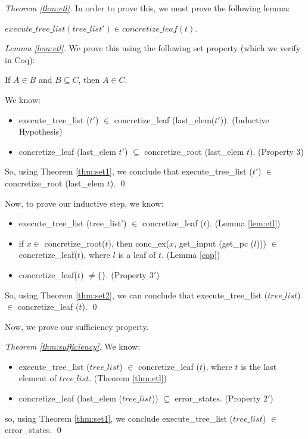 \begin{proof}[Theorem \ref{thm:etl}]
In order to prove this, we must prove the following lemma:
\begin{lemma} 
\label{lem:etl}
$execute\_tree\_list (tree\_list') \in concretize\_leaf (t)$.
\end{lemma}
\begin{proof}[Lemma \ref{lem:etl}]
We prove this using the following set property (which we verify in Coq):

\begin{theorem} \label{thm:set1}
If $A \in B$ and $B \subseteq C$, then $A \in C$.
\end{theorem}

We know:
\begin{itemize}
\item execute\_tree\_list ($t'$) $\in$
        concretize\_leaf (last\_elem($t'$)). (Inductive Hypothesis)
\item 
concretize\_leaf (last\_elem $t'$) $\subseteq$ concretize\_root (last\_elem $t$). (Property $3$)
 \end{itemize}
 
 So, using Theorem \ref{thm:set1}, we conclude that execute\_tree\_list ($t'$) $\in$ concretize\_root (last\_elem $t$). \qed
\end{proof}

Now, to prove our inductive step, we know:
\begin{itemize}
\item execute\_tree\_list (tree\_list') $\in$ concretize\_leaf ($t$). (Lemma \ref{lem:etl})
\item if $x \in$ concretize\_root($t$), then  conc\_ex($x$, get\_input (get\_pc ($l$))) $\in$ concretize\_leaf($t$),
where $l$ is a leaf of $t$. (Lemma \ref{cop})
\item concretize\_leaf($t$) $\neq \{\} $. (Property $3'$)
\end{itemize}

So, using Theorem \ref{thm:set2}, we can conclude that execute\_tree\_list ($tree\_list$) $\in$ concretize\_leaf ($t$). \qed
\end{proof}

Now, we prove our sufficiency property.

\begin{proof}[Theorem \ref{thm:sufficiency}]
We know:
\begin{itemize}
\item execute\_tree\_list ($tree\_list$) $\in$ concretize\_leaf ($t$), where $t$ is the last element of $tree\_list$. (Theorem \ref{thm:etl})
\item concretize\_leaf (last\_elem ($tree\_list$)) $\subseteq$ error\_states. (Property $2'$)
\end{itemize}
so, using Theorem \ref{thm:set1}, we conclude
execute\_tree\_list ($tree\_list$) $\in$ error\_states. \qed
\end{proof}

